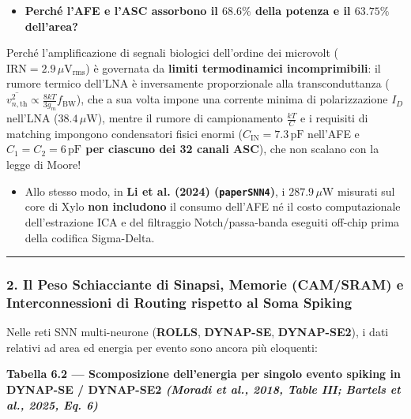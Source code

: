 \documentclass[11pt,a4paper]{article}
\begin{document}
\begin{itemize}
  \item \textbf{Perché l'AFE e l'ASC assorbono il $68.6\%$ della potenza e il $63.75\%$ dell'area?}
\end{itemize}
Perché l'amplificazione di segnali biologici dell'ordine dei microvolt ($\text{IRN} = 2.9\,\mu\text{V}_{\text{rms}}$) è governata da \textbf{limiti termodinamici incomprimibili}: il rumore termico dell'LNA è inversamente proporzionale alla transconduttanza ($\overline{v_{n,\text{th}}^2} \propto \frac{8kT}{3g_m} f_{\text{BW}}$), che a sua volta impone una corrente minima di polarizzazione $I_D$ nell'LNA ($38.4\,\mu\text{W}$), mentre il rumore di campionamento $\frac{kT}{C}$ e i requisiti di matching impongono condensatori fisici enormi (\textbf{$C_{\text{IN}} = 7.3\,\text{pF}$} nell'AFE e \textbf{$C_1 = C_2 = 6\,\text{pF}$ per ciascuno dei 32 canali ASC}), che non scalano con la legge di Moore!
\begin{itemize}
  \item Allo stesso modo, in \textbf{Li et al. (2024) (\texttt{paperSNN4})}, i $287.9\,\mu\text{W}$ misurati sul core di Xylo \textbf{non includono} il consumo dell'AFE né il costo computazionale dell'estrazione ICA e del filtraggio Notch/passa-banda eseguiti off-chip prima della codifica Sigma-Delta.
\end{itemize}

\bigskip\hrule\bigskip

\subsubsection{2. Il Peso Schiacciante di Sinapsi, Memorie (CAM/SRAM) e Interconnessioni di Routing rispetto al Soma Spiking}
Nelle reti SNN multi-neurone (\textbf{ROLLS}, \textbf{DYNAP-SE}, \textbf{DYNAP-SE2}), i dati relativi ad area ed energia per evento sono ancora più eloquenti:

\textbf{Tabella 6.2 --- Scomposizione dell'energia per singolo evento spiking in DYNAP-SE / DYNAP-SE2 \textit{(Moradi et al., 2018, Table III; Bartels et al., 2025, Eq. 6)}}
\end{document}
